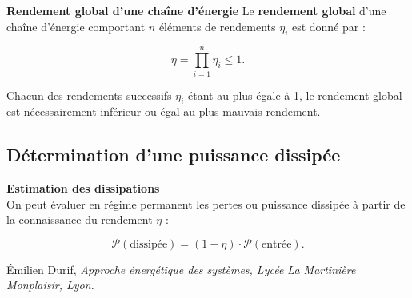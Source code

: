\begin{prop}\textbf{Rendement global d'une chaîne d'énergie}
Le \textbf{rendement global} d'une chaîne d'énergie comportant $n$ éléments de rendements $\eta_i$ est donné par : 

$$
\displaystyle{\eta=\prod_{i=1}^n\eta_i\leq 1}.
$$

Chacun des rendements successifs $\eta_i$ étant au plus égale à 1, le rendement global est nécessairement inférieur ou égal au plus mauvais rendement.
\end{prop}

\subsection{Détermination d'une puissance dissipée}

\begin{prop}\textbf{Estimation des dissipations} \\
On peut évaluer en régime permanent les pertes ou puissance dissipée à partir de la connaissance du rendement $\eta$ : 

$$\mathcal{P}(\text{dissipée})=(1-\eta)\cdot \mathcal{P}(\text{entrée}).
$$


\end{prop}


\begin{thebibliography}{2}
    Émilien Durif, {\it Approche énergétique des systèmes, Lycée La Martinière Monplaisir, Lyon.}
\end{thebibliography}

